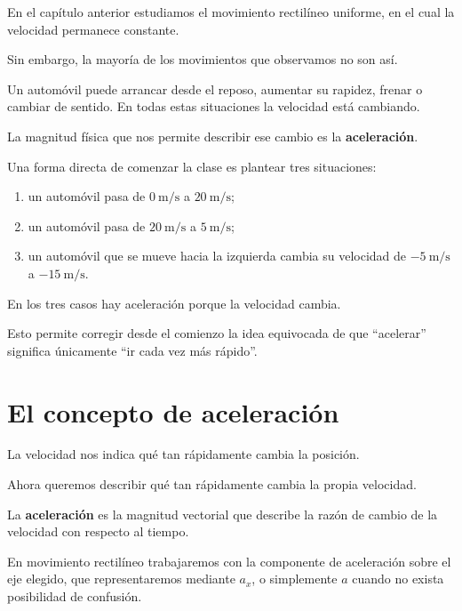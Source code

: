 ﻿En el capítulo anterior estudiamos el movimiento rectilíneo uniforme, en el
cual la velocidad permanece constante.

Sin embargo, la mayoría de los movimientos que observamos no son así.

Un automóvil puede arrancar desde el reposo, aumentar su rapidez, frenar o
cambiar de sentido. En todas estas situaciones la velocidad está cambiando.

La magnitud física que nos permite describir ese cambio es la
\textbf{aceleración}.

\begin{notapedagogica}
Una forma directa de comenzar la clase es plantear tres situaciones:

\begin{enumerate}
    \item un automóvil pasa de \(\SI{0}{\meter\per\second}\) a
    \(\SI{20}{\meter\per\second}\);

    \item un automóvil pasa de \(\SI{20}{\meter\per\second}\) a
    \(\SI{5}{\meter\per\second}\);

    \item un automóvil que se mueve hacia la izquierda cambia su velocidad
    de \(-\SI{5}{\meter\per\second}\) a
    \(-\SI{15}{\meter\per\second}\).
\end{enumerate}

En los tres casos hay aceleración porque la velocidad cambia.

Esto permite corregir desde el comienzo la idea equivocada de que
``acelerar'' significa únicamente ``ir cada vez más rápido''.
\end{notapedagogica}


\section{El concepto de aceleración}

La velocidad nos indica qué tan rápidamente cambia la posición.

Ahora queremos describir qué tan rápidamente cambia la propia velocidad.

\begin{definicion}[Aceleración]
La \textbf{aceleración} es la magnitud vectorial que describe la razón de
cambio de la velocidad con respecto al tiempo.
\end{definicion}

En movimiento rectilíneo trabajaremos con la componente de aceleración sobre
el eje elegido, que representaremos mediante \(a_x\), o simplemente \(a\)
cuando no exista posibilidad de confusión.

